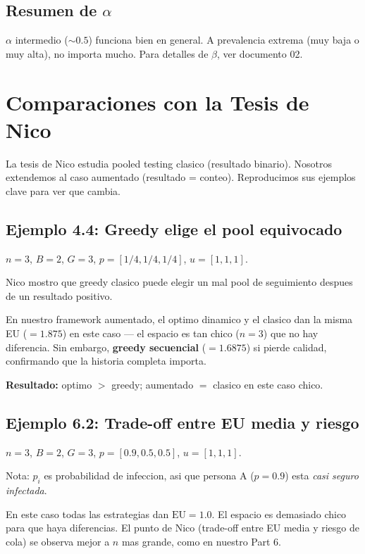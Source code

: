 \documentclass[11pt]{article}
\begin{document}
\subsection{Resumen de $\alpha$}

$\alpha$ intermedio ($\sim 0.5$) funciona bien en general.
A prevalencia extrema (muy baja o muy alta), no importa mucho.
Para detalles de $\beta$, ver documento 02.

\section{Comparaciones con la Tesis de Nico}

La tesis de Nico estudia pooled testing clasico (resultado binario).
Nosotros extendemos al caso aumentado (resultado = conteo).
Reproducimos sus ejemplos clave para ver que cambia.

\subsection{Ejemplo 4.4: Greedy elige el pool equivocado}

$n=3$, $B=2$, $G=3$, $p = [1/4, 1/4, 1/4]$, $u = [1, 1, 1]$.

Nico mostro que greedy clasico puede elegir un mal pool de seguimiento
despues de un resultado positivo.

En nuestro framework aumentado, el optimo dinamico y el clasico dan
la misma EU ($= 1.875$) en este caso --- el espacio es tan chico ($n=3$)
que no hay diferencia.
Sin embargo, \textbf{greedy secuencial} ($= 1.6875$) si pierde calidad,
confirmando que la historia completa importa.

\textbf{Resultado:} optimo $>$ greedy; aumentado $=$ clasico en este caso chico.

\subsection{Ejemplo 6.2: Trade-off entre EU media y riesgo}

$n=3$, $B=2$, $G=3$, $p = [0.9, 0.5, 0.5]$, $u = [1, 1, 1]$.

Nota: $p_i$ es probabilidad de infeccion, asi que persona A ($p=0.9$)
esta \emph{casi seguro infectada}.

En este caso todas las estrategias dan $\text{EU} = 1.0$.
El espacio es demasiado chico para que haya diferencias.
El punto de Nico (trade-off entre EU media y riesgo de cola)
se observa mejor a $n$ mas grande, como en nuestro Part 6.
\end{document}
